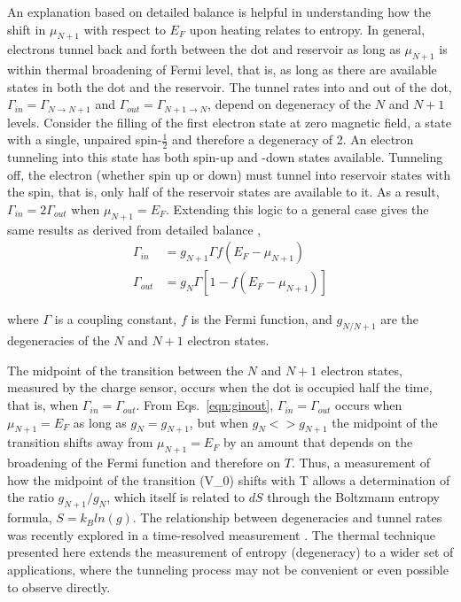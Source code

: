 \documentclass[twocolumn,showpacs,preprintnumbers,amsmath,amssymb,pra,aps,superscriptaddress]{revtex4-1}
\begin{document}
An explanation based on detailed balance is helpful in understanding how the shift in $\mu_{N+1}$ with respect to $E_F$ upon heating relates to entropy.   In general, electrons tunnel back and forth between the dot and reservoir as long as $\mu_{N+1}$ is within thermal broadening of Fermi level, that is, as long as there are available states in both the dot and the reservoir.  The tunnel rates into and out of the dot, $\Gamma_{in}=\Gamma_{N\rightarrow N+1}$ and $\Gamma_{out}=\Gamma_{N+1\rightarrow N}$, depend on degeneracy of the $N$ and $N+1$ levels.  Consider the filling of the first electron state at zero magnetic field, a state with a single, unpaired spin-$\frac{1}{2}$ and therefore a degeneracy of 2. An electron tunneling into this state has both spin-up and -down states available.  Tunneling off, the electron (whether spin up or down) must tunnel into reservoir states with the spin, that is, only half of the reservoir states are available to it. As a result, $\Gamma_{in} = 2\Gamma_{out}$ when $\mu_{N+1}=E_F$. Extending this logic to a general case gives the same results as derived from detailed balance \cite{Gustavsson2009}, 
%
\begin{align}
	\Gamma_{in} &=  g_{N+1} \Gamma f(E_F - \mu_{N+1}) \label{eqn:gin}\\
	\Gamma_{out} &= g_{N} \Gamma [1 - f(E_F - \mu_{N+1})] \label{eqn:gout}
\end{align}
%

where $\Gamma$ is a coupling constant, $f$ is the Fermi function, and $g_{N/N+1}$ are the degeneracies of the $N$ and $N+1$ electron states.

The midpoint of the transition between the $N$ and $N+1$ electron states, measured by the charge sensor, occurs when the dot is occupied half the time, that is, when $\Gamma_{in} = \Gamma_{out}$. From Eqs.~\ref{eqn:ginout}, $\Gamma_{in} = \Gamma_{out}$ occurs when $\mu_{N+1} = E_F$ as long as $g_{N}=g_{N+1}$, but when $g_{N}<>g_{N+1}$ the midpoint of the transition shifts away from $\mu_{N+1}=E_F$ by an amount that depends on the broadening of the Fermi function and therefore on $T$.   Thus, a measurement of how the midpoint of the transition (V_0) shifts with T allows a determination of the ratio $g_{N+1}/g_{N}$, which itself is related to $dS$ through the Boltzmann entropy formula, $S=k_B ln(g)$.  The relationship between degeneracies and tunnel rates was recently explored in a time-resolved measurement \cite{Hofmann2016}.  The thermal technique presented here extends the measurement of entropy (degeneracy) to a wider set of applications, where the tunneling process may not be convenient or even possible to observe directly.
\end{document}
